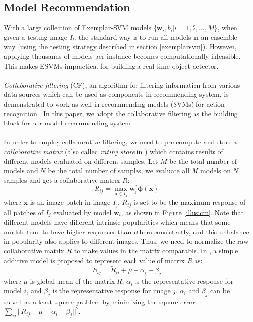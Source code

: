 \documentclass{article} %
\begin{document}
\subsection{Model Recommendation}
\label{modelrecommendation}
With a large collection of Exemplar-SVM models $\{\mathbf{w}_i,b_i|i=1,2,...,M\}$, when given a testing image $I_t$, the standard way is to run all models in an ensemble way (using the testing strategy described in section \ref{exemplarsvm}). However, applying thousands of models per instance becomes computationally infeasible. This makes ESVMs impractical for building a real-time object detector. \\\\
\emph{Collaborative filtering} (CF), an algorithm for filtering information from various data sources which can be used as components in recommending system, is demonstrated to work as well in recommending models (SVMs) for action recognition \cite{matikainen2012model}. In this paper, we adopt the collaborative filtering as the building block for our model recommending system. \\\\
In order to employ collaborative filtering, we need to pre-compute and store a \emph{collaborative matrix} (also called \emph{rating store} in \cite{matikainen2012model}) which contains results of different models evaluated on different samples. Let $M$ be the total number of models and $N$ be the total number of samples, we evaluate all $M$ models on $N$ samples and get a collaborative matrix $R$:
$$R_{ij}=\max_{\mathbf{x}{\in}I_j}\mathbf{w}_i^T\mathbf{\phi(x)}$$
where $\mathbf{x}$ is an image patch in image $I_j$. $R_{ij}$ is set to be the maximum response of all patches of $I_j$ evaluated by model $\mathbf{w}_i$, as shown in Figure \ref{illus:cm}. Note that different models have different intrinsic popularities which means that some models tend to have higher responses than others consistently, and this unbalance in popularity also applies to different images. Thus, we need to normalize the raw collaborative matrix $R$ to make values in the matrix comparable. In \cite{koren2010factor}, a simple additive model is proposed to represent each value of matrix $R$ as:
$$R_{ij}=\tilde{R}_{ij}+\mu+\alpha_i+\beta_j$$
where $\mu$ is global mean of the matrix $R$, $\alpha_i$ is the representative response for model $i$, and $\beta_j$ is the representative response for image $j$. $\alpha_i$ and $\beta_j$ can be solved as a least square problem by minimizing the square error $\sum_{ij}||R_{ij}-\mu-\alpha_i-\beta_j||^2$. \\\\
\end{document}
